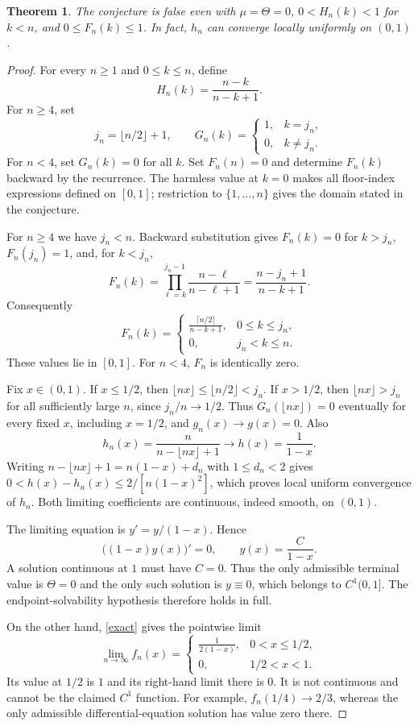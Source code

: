 \documentclass[11pt]{article}
\newtheorem{theorem}{Theorem}
\begin{document}
\begin{theorem}
The conjecture is false even with $\mu=\Theta=0$,
$0<H_n(k)<1$ for $k<n$, and $0\leq F_n(k)\leq1$.
In fact, $h_n$ can converge locally uniformly on $(0,1)$.
\end{theorem}
\begin{proof}
For every $n\geq1$ and $0\leq k\leq n$, define
\[
 H_n(k)=\frac{n-k}{n-k+1}.
\]
For $n\geq4$, set
\[
 j_n=\lfloor n/2\rfloor+1,\qquad
 G_n(k)=\begin{cases}1,&k=j_n,\\0,&k\ne j_n.\end{cases}
\]
For $n<4$, set $G_n(k)=0$ for all $k$. Set $F_n(n)=0$
and determine $F_n(k)$ backward by the recurrence.
The harmless value at $k=0$ makes all floor-index expressions
defined on $[0,1]$; restriction to $\{1,\ldots,n\}$ gives
the domain stated in the conjecture.

For $n\geq4$ we have $j_n<n$. Backward substitution gives
$F_n(k)=0$ for $k>j_n$, $F_n(j_n)=1$, and, for $k<j_n$,
\[
 F_n(k)=\prod_{\ell=k}^{j_n-1}\frac{n-\ell}{n-\ell+1}
       =\frac{n-j_n+1}{n-k+1}.
\]
Consequently
\begin{equation}\label{exact}
 F_n(k)=
 \begin{cases}
 \displaystyle\frac{\lceil n/2\rceil}{n-k+1},&0\leq k\leq j_n,\\[5pt]
 0,&j_n<k\leq n.
 \end{cases}
\end{equation}
These values lie in $[0,1]$. For $n<4$, $F_n$ is identically zero.

Fix $x\in(0,1)$. If $x\leq1/2$, then
$\lfloor nx\rfloor\leq\lfloor n/2\rfloor<j_n$.
If $x>1/2$, then $\lfloor nx\rfloor>j_n$ for all sufficiently
large $n$, since $j_n/n\to1/2$.
Thus $G_n(\lfloor nx\rfloor)=0$ eventually for every fixed $x$,
including $x=1/2$, and $g_n(x)\to g(x)=0$.
Also
\[
 h_n(x)=\frac{n}{n-\lfloor nx\rfloor+1}
       \longrightarrow h(x)=\frac1{1-x}.
\]
Writing $n-\lfloor nx\rfloor+1=n(1-x)+d_n$ with $1\leq d_n<2$
gives $0<h(x)-h_n(x)\leq2/[n(1-x)^2]$,
which proves local uniform convergence of $h_n$.
Both limiting coefficients are continuous, indeed smooth, on $(0,1)$.

The limiting equation is $y'=y/(1-x)$. Hence
\[
 \bigl((1-x)y(x)\bigr)'=0,\qquad
 y(x)=\frac{C}{1-x}.
\]
A solution continuous at $1$ must have $C=0$.
Thus the only admissible terminal value is $\Theta=0$ and
the only such solution is $y\equiv0$, which belongs to $C^1(0,1]$.
The endpoint-solvability hypothesis therefore holds in full.

On the other hand, \eqref{exact} gives the pointwise limit
\begin{equation}\label{limit}
 \lim_{n\to\infty}f_n(x)=
 \begin{cases}
 \displaystyle\frac1{2(1-x)},&0<x\leq1/2,\\[5pt]
 0,&1/2<x<1.
 \end{cases}
\end{equation}
Its value at $1/2$ is $1$ and its right-hand limit there is $0$.
It is not continuous and cannot be the claimed $C^1$ function.
For example, $f_n(1/4)\to2/3$, whereas the only admissible
differential-equation solution has value zero there.
\end{proof}
\end{document}
